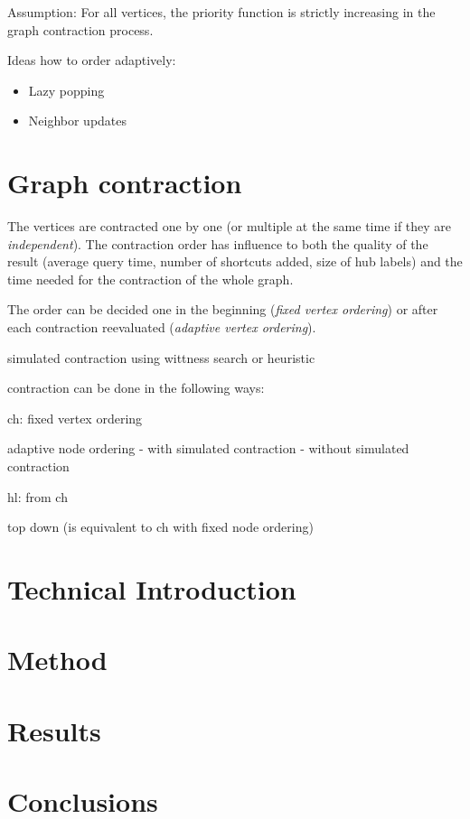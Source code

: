 Assumption: For all vertices, the priority function is strictly increasing in the graph contraction process.

Ideas how to order adaptively:
\begin{itemize}
      \item
            Lazy popping


      \item
            Neighbor updates
\end{itemize}

\chapter{Graph contraction}
The vertices are contracted one by one (or multiple at the same time if they are \emph{independent}). The contraction order has influence to both the quality of the result (average query time, number of shortcuts added, size of hub labels) and the time needed for the contraction of the whole graph.

The order can be decided one in the beginning (\emph{fixed vertex ordering}) or after each contraction reevaluated (\emph{adaptive vertex ordering}).

simulated contraction using wittness search or heuristic

contraction can be done in the following ways:

ch:
fixed vertex ordering

adaptive node ordering
- with simulated contraction
- without simulated contraction


hl:
from ch

top down (is equivalent to ch with fixed node ordering)



\chapter{Technical Introduction}

\chapter{Method}

\chapter{Results}

\chapter{Conclusions}